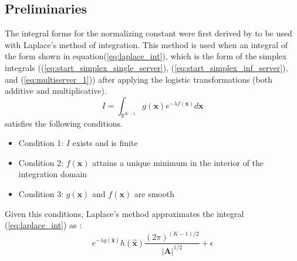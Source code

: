 \subsection{Preliminaries}
The integral forms for the normalizing constant were first derived by \cite{Casale2017AcceleratingMethods} to be used with Laplace's method of integration. This method is used when an integral of the form shown in equation(\ref{eq:laplace_int}), which is the form of the simplex integrals ((\ref{eq:start_simplex_single_server}), (\ref{eq:start_simplex_inf_server}), and (\ref{eq:multiserver_1})) after applying the logistic transformations (both additive and multiplicative).
\begin{equation} \label{eq:laplace_int}
    I = \int_{\mathbb{R}^{K-1}} g(\mathbf{x}) e^{-\lambda f(\mathbf{x})} d\mathbf{x}
\end{equation}
satisfies the following conditions.
\begin{itemize}[noitemsep]
    \item Condition 1: \(I\) exists and is finite
    \item Condition 2: \(f(\mathbf{x})\)  attains a unique minimum in the interior of the integration domain
    \item Condition 3: \(g(\mathbf{x})\) and \(f(\mathbf{x})\) are smooth
\end{itemize}

Given this conditions, Laplace's method approximates the integral (\ref{eq:laplace_int}) as \cite{Azevedo-Filho1994LaplacesVariables}:
\[e^{- \lambda g(\mathbf{\hat{x}}) } h(\mathbf{\hat{x}}) { \frac{(2\pi)^{(K-1)/2}}{|\mathbf{A}|^{1/2}} } + \epsilon \]

